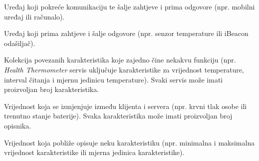 \begin{description}[style=nextline]
    \item[Klijent] 
        Uređaj koji pokreće komunikaciju te šalje zahtjeve i prima odgovore (npr. mobilni uređaj ili računalo).
    \item[Server] 
        Uređaj koji prima zahtjeve i šalje odgovore (npr. senzor temperature ili iBeacon odašiljač).
    \item[Servis] 
        Kolekcija povezanih karakteristika koje zajedno čine nekakvu funkciju (npr. \textit{Health Thermometer} servis uključuje                     karakteristike za vrijednost temperature, interval čitanja i mjernu jedinicu temperature). 
        Svaki servis može imati proizvoljan broj karakteristika.
    \item[Karakteristika\footnote{engl. \textit{Characteristic}}] 
        Vrijednost koja se izmjenjuje između klijenta i servera (npr. krvni tlak osobe ili trenutno stanje baterije). 
        Svaka karakteristika može imati proizvoljan broj opisnika.
    \item[Opisnik\footnote{engl. \textit{Descriptor}}] 
        Vrijednost koja pobliže opisuje neku karakteristiku (npr. minimalna i maksimalna vrijednost karakteristike ili mjerna jedinica karakteristike).
\end{description}